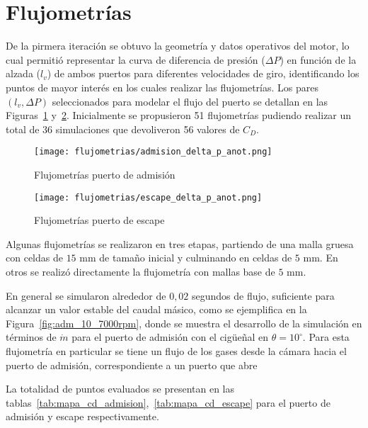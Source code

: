 \section{Flujometrías}

De la pirmera iteración se obtuvo la geometría y datos operativos del motor, lo
cual permitió representar la curva de diferencia de presión ($\Delta P$) en
función de la alzada ($l_{v}$) de ambos puertos para diferentes velocidades de
giro, identificando los puntos de mayor interés en los cuales realizar las
flujometrías.
%
Los pares $(l_{v}, \Delta P)$ seleccionados para modelar el flujo del puerto se
detallan en las Figuras~\ref{fig:delta_p_admision} y~\ref{fig:delta_p_escape}.
%
Inicialmente se propusieron 51 flujometrías pudiendo realizar un total de 36
simulaciones que devoliveron 56 valores de $C_{D}$.

\begin{figure}[h]
  \centering
  \texttt{[image: flujometrias/admision\_delta\_p\_anot.png]}
  \caption{Flujometrías puerto de admisión}\label{fig:delta_p_admision}
\end{figure}

\begin{figure}[h]
  \centering
  \texttt{[image: flujometrias/escape\_delta\_p\_anot.png]}
  \caption{Flujometrías puerto de escape}\label{fig:delta_p_escape}
\end{figure}


Algunas flujometrías se realizaron en tres etapas, partiendo de una malla gruesa
con celdas de $15$ mm de tamaño inicial y culminando en celdas de $5$ mm.
%
En otros se realizó directamente la flujometría con mallas base de $5$ mm.

En general se simularon alrededor de $0,02$ segundos de flujo, suficiente para
alcanzar un valor estable del caudal másico, como se ejemplifica en la
Figura~\ref{fig:adm_10_7000rpm}, donde se muestra el desarrollo de la simulación
en términos de $\dot{m}$ para el puerto de admisión con el cigüeñal en
$\theta=10^{\circ}$.
%
Para esta flujometría en particular se tiene un flujo de los gases desde la
cámara hacia el puerto de admisión, correspondiente a un puerto que abre

%
%
La totalidad de puntos evaluados se presentan en las
tablas~\ref{tab:mapa_cd_admision},~\ref{tab:mapa_cd_escape} para el puerto de
admisión y escape respectivamente.

